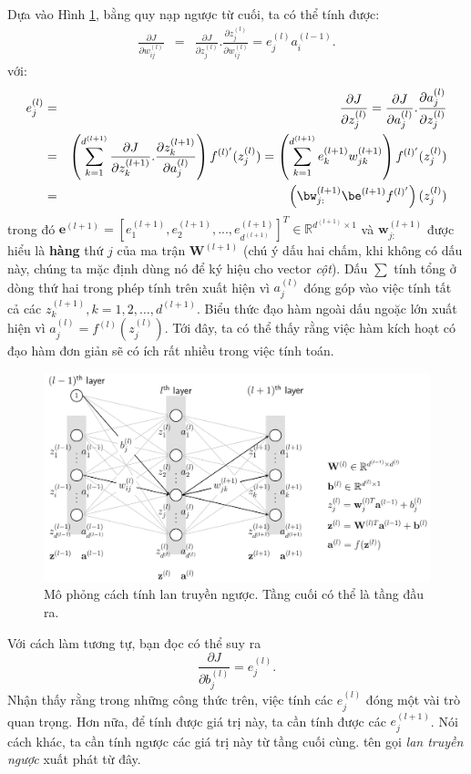 Dựa vào Hình \ref{fig:14_6_2}, bằng quy nạp ngược từ cuối, ta có thể tính được:
\begin{eqnarray} 
\frac{\partial J}{\partial w_{ij}^{(l)}} &=& \frac{\partial J}{\partial
z_j^{(l)}}. \frac{\partial z_j^{(l)}}{\partial w_{ij}^{(l)}} = e_j^{(l)} a_i^{(l-1)}. 
\end{eqnarray} 
\newpage
với:
\begin{eqnarray*} 
e_j^{(l)} &=& \frac{\partial J}{\partial z_j^{(l)}} = \frac{\partial J}{\partial a_j^{(l)}} . \frac{\partial a_j^{(l)}}{\partial z_j^{(l)}} \\\ 
&=& \left( \sum_{k = 1}^{d^{(l+1)}} \frac{\partial J}{\partial z_k^{(l+1)}}
.\frac{\partial z_k^{(l+1)}}{\partial a_j^{(l)}} \right) f^{(l)'}(z_j^{(l)}) =\left( \sum_{k = 1}^{d^{(l+1)}} e_k^{(l+1)} w_{jk}^{(l+1)} \right)
 f^{(l)'}(z_j^{(l)}) \\
 &=& \left(\bw_{j:}^{(l+1)}\be^{(l+1)}f^{(l)'}\right)(z_j^{(l)})
\end{eqnarray*} 
trong đó $\mathbf{e}^{(l+1)} = [e_1^{(l+1)}, e_2^{(l+1)}, ...,
e_{d^{(l+1)}}^{(l+1)}]^T \in \mathbb{R}^{d^{(l+1)}\times 1} $ và
$\mathbf{w}_{j:}^{(l+1)}$ được hiểu là \textbf{hàng} thứ $j$ của ma trận
$\mathbf{W}^{(l+1)}$ (chú ý dấu hai chấm, khi không có dấu này, chúng ta mặc
định dùng nó để ký hiệu cho vector \textit{cột}).
 Dấu $\sum$ tính tổng ở dòng thứ hai trong phép tính trên xuất hiện vì
$a_{j}^{(l)}$ {đóng góp} vào việc tính tất cả các $z_k^{(l+1)}, k = 1, 2,
\dots, d^{(l+1)}$. Biểu thức đạo hàm ngoài dấu ngoặc lớn xuất hiện vì $a_j^{(l)}  =
f^{(l)}(z_j^{(l)})$. Tới đây, ta có thể thấy rằng việc hàm kích hoạt có
đạo hàm đơn giản sẽ có ích rất nhiều trong việc tính toán.
\begin{figure}[t]
\centering
    \includegraphics[width =
    .95\textwidth]{Chapters/05_NeuralNetworks/14_mlp/latex/backpropagation.pdf}
    \caption[]{Mô phỏng cách tính lan truyền ngược. Tầng cuối có thể là tầng đầu ra.}
    \label{fig:14_6_2}
\end{figure}
Với cách làm tương tự, bạn đọc có thể suy ra
\begin{equation} 
\frac{\partial J}{\partial b_j^{(l)}} = e_j^{(l)}.
\end{equation}
Nhận thấy rằng trong những công thức trên, việc tính các $e_j^{(l)}$ đóng một vài trò quan trọng. Hơn nữa, để tính được giá trị này, ta cần tính được các $e_j^{(l+1)}$. Nói cách khác, ta cần tính {ngược} các giá trị này từ tầng cuối cùng. tên gọi \textit{lan truyền ngược} xuất phát từ đây.
 
